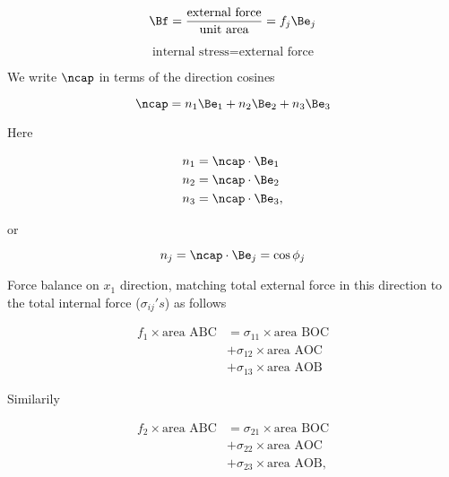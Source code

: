 \begin{equation}\label{eqn:continuumL4:150}
\Bf = \frac{\text{external force}}{\text{unit area}} = f_j \Be_j
\end{equation}

\begin{equation}\label{eqn:continuumL4:170}
\text{internal stress} = \text{external force}
\end{equation}

We write $\ncap$ in terms of the direction cosines

\begin{equation}\label{eqn:continuumL4:190}
\ncap = 
n_1 \Be_1 + 
n_2 \Be_2 + 
n_3 \Be_3 
\end{equation}

Here 

\begin{align}\label{eqn:continuumL4:210}
n_1 &= \ncap \cdot \Be_1 \\
n_2 &= \ncap \cdot \Be_2 \\
n_3 &= \ncap \cdot \Be_3,
\end{align}

or 

\begin{equation}\label{eqn:continuumL4:230}
n_j = \ncap \cdot \Be_j = \cos\phi_j
\end{equation}

Force balance on $x_1$ direction, matching total external force in this direction to the total internal force ($\sigma_{ij}'s$) as follows

\begin{equation}\label{eqn:continuumL4:250}
\begin{aligned}
f_1 \times \text{area ABC} 
&= 
\sigma_{11} \times \text{area BOC} \\
&+\sigma_{12} \times \text{area AOC} \\
&+\sigma_{13} \times \text{area AOB}
\end{aligned}
\end{equation}

Similarily

\begin{equation}\label{eqn:continuumL4:270}
\begin{aligned}
f_2 \times \text{area ABC} 
&= 
\sigma_{21} \times \text{area BOC} \\
&+\sigma_{22} \times \text{area AOC} \\
&+\sigma_{23} \times \text{area AOB},
\end{aligned}
\end{equation}

